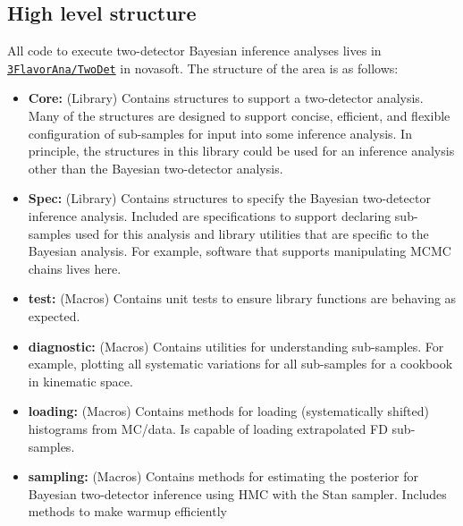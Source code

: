 \documentclass{article}
\begin{document}
\subsection{High level structure}
All code to execute two-detector Bayesian inference analyses lives in \href{https://github.com/novaexperiment/novasoft/tree/main/3FlavorAna/TwoDet}{\texttt{3FlavorAna/TwoDet}} in novasoft. The structure of the area is as follows:
\begin{itemize}
    \item \textbf{Core:} (Library) Contains structures to support a two-detector analysis. Many of the structures are designed to support concise, efficient, and flexible configuration of sub-samples for input into some inference analysis. In principle, the structures in this library could be used for an inference analysis other than the Bayesian two-detector analysis.
    \item \textbf{Spec:} (Library) Contains structures to specify the Bayesian two-detector inference analysis. Included are specifications to support declaring sub-samples used for this analysis and library utilities that are specific to the Bayesian analysis. For example, software that supports manipulating MCMC chains lives here.
    \item \textbf{test:} (Macros) Contains unit tests to ensure library functions are behaving as expected.
    \item \textbf{diagnostic:} (Macros) Contains utilities for understanding sub-samples. For example, plotting all systematic variations for all sub-samples for a cookbook in kinematic space.
    \item \textbf{loading:} (Macros) Contains methods for loading (systematically shifted) histograms from MC/data. Is capable of loading extrapolated FD sub-samples.
    \item \textbf{sampling:} (Macros) Contains methods for estimating the posterior for Bayesian two-detector inference using HMC with the Stan sampler. Includes methods to make warmup efficiently
\end{itemize}
\end{document}
